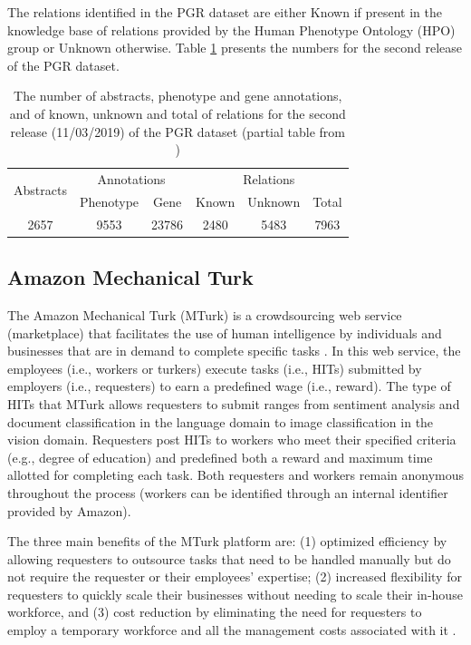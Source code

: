 The relations identified in the PGR dataset are either Known if present in the knowledge base of relations provided by the Human Phenotype Ontology (HPO) group \citep{kohler2017human} or Unknown otherwise. Table \ref{tab1} presents the numbers for the second release of the PGR dataset.

\begin{table}[h]
\centering
\caption[General Statistics for the PGR Dataset]{The number of abstracts, phenotype and gene annotations, and of known, unknown and total of relations for the second release (11/03/2019) of the PGR dataset (partial table from \citep{sousa2019silver})}\label{tab1}
\begin{tabular}{cccccc}
\hline
\multirow{2}{*}{Abstracts} & \multicolumn{2}{c}{Annotations} & \multicolumn{3}{c}{Relations} \\
\cline{2-6}
& Phenotype & Gene & Known & Unknown & Total \\
\hline
2657 & 9553 & 23786 & 2480 & 5483 & 7963 \\
\hline
\end{tabular}
\end{table}

\subsection{Amazon Mechanical Turk}

The Amazon Mechanical Turk (MTurk) is a crowdsourcing web service (marketplace) that facilitates the use of human intelligence by individuals and businesses that are in demand to complete specific tasks \citep{paolacci2010running}. In this web service, the employees (i.e., workers or turkers) execute tasks (i.e., HITs) submitted by employers (i.e., requesters) to earn a predefined wage (i.e., reward). The type of HITs that MTurk allows requesters to submit ranges from sentiment analysis and document classification in the language domain to image classification in the vision domain. Requesters post HITs to workers who meet their specified criteria (e.g., degree of education) and predefined both a reward and maximum time allotted for completing each task. Both requesters and workers remain anonymous throughout the process (workers can be identified through an internal identifier provided by Amazon). 

The three main benefits of the MTurk platform are: (1) optimized efficiency by allowing requesters to outsource tasks that need to be handled manually but do not require the requester or their employees' expertise; (2) increased flexibility for requesters to quickly scale their businesses without needing to scale their in-house workforce, and (3) cost reduction by eliminating the need for requesters to employ a temporary workforce and all the management costs associated with it \citep{ipeirotis2010quality}.

